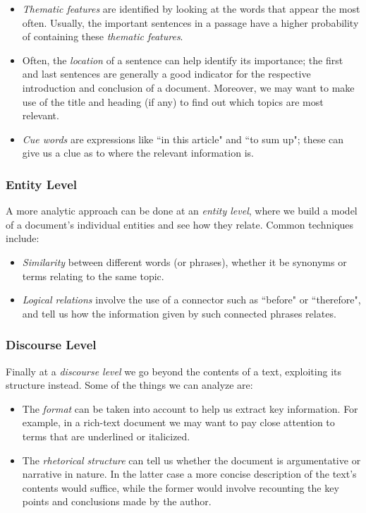 \begin{itemize}
\item \textit{Thematic features} are identified by looking at the words that appear the most often. Usually, the important sentences in a passage have a higher probability of containing these \textit{thematic features}.
\item Often, the \textit{location} of a sentence can help identify its importance; the first and last sentences are generally a good indicator for the respective introduction and conclusion of a document. Moreover, we may want to make use of the title and heading (if any) to find out which topics are most relevant.
\item \textit{Cue words} are expressions like ``in this article" and ``to sum up"; these can give us a clue as to where the relevant information is.
\end{itemize}

\subsubsection{Entity Level}

A more analytic approach can be done at an \textit{entity level}, where we build a model of a document's individual entities and see how they relate. Common techniques include:

\begin{itemize}
\item \textit{Similarity} between different words (or phrases), whether it be synonyms or terms relating to the same topic.
\item \textit{Logical relations} involve the use of a connector such as ``before" or ``therefore", and tell us how the information given by such connected phrases relates.
\end{itemize}

\subsubsection{Discourse Level}

Finally at a \textit{discourse level} we go beyond the contents of a text, exploiting its structure instead. Some of the things we can analyze are:

\begin{itemize}
\item The \textit{format} can be taken into account to help us extract key information. For example, in a rich-text document we may want to pay close attention to terms that are underlined or italicized.
\item The \textit{rhetorical structure} can tell us whether the document is argumentative or narrative in nature. In the latter case a more concise description of the text's contents would suffice, while the former would involve recounting the key points and conclusions made by the author.
\end{itemize}

